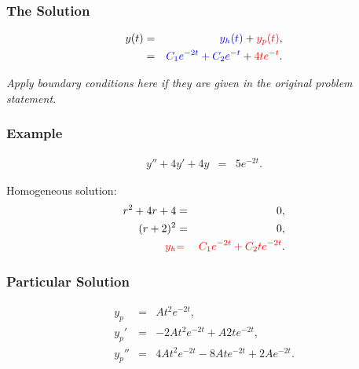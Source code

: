 \begin{frame}
  \frametitle{The Solution}

  \begin{eqnarray*}
    y(t) & = & {\color{blue}y_h(t)} + {\color{red}y_p(t)}, \\
         & = & {\color{blue}C_1 e^{-2t} + C_2 e^{-t}} + {\color{red}4te^{-t}}.
  \end{eqnarray*}

  \textit{Apply boundary conditions here if they are given in the original problem statement.}

\end{frame}

\begin{frame}
  \frametitle{Example}

  \begin{eqnarray*}
    y'' + 4y' + 4y & = & 5 e^{-2t}.
  \end{eqnarray*}

  {
    Homogeneous solution:
    \begin{eqnarray*}
      r^2 + 4r + 4 & = & 0, \\
      (r+2)^2 & = & 0, \\
      {\color{red}y_h} & {\color{red}=} & {\color{red}C_1 e^{-2t} + C_2 t e^{-2t}}.
    \end{eqnarray*}
  }

\end{frame}

\begin{frame}
  \frametitle{Particular Solution}
  
  \begin{eqnarray*}
    y_p & = & A t^2 e^{-2t}, \\
    y_p' & = & -2 A t^2 e^{-2t} + A 2t e^{-2t}, \\
    y_p'' & = & 4 A t^2 e^{-2t} - 8A t e^{-2t} + 2 A e^{-2t}.
  \end{eqnarray*}



\end{frame}


